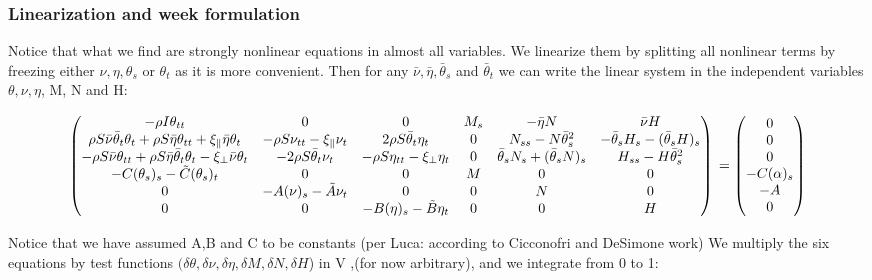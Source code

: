 
\usepackage{pdfsync}
\usepackage{amsmath}
\usepackage{graphicx}

\subsubsection{Linearization and week formulation}

Notice that what we find are strongly nonlinear equations in almost all variables.
We linearize them by splitting all nonlinear terms by freezing either $\nu, \eta, \theta_s$ or $\theta_t$ as it is more convenient. Then for any $\bar{\nu}, \bar{\eta}, \bar{\theta}_s$ and $\bar{\theta}_t$ we can write the linear system in the independent variables $\theta, \nu, \eta$, M, N and H:

\[\begin{pmatrix}
-\rho I \theta_{tt} & 0 & 0 & M_s & -\bar{\eta}N & \bar{\nu}H %
\\
\rho S\bar{\nu}\bar{\theta}_t\theta_t + \rho S \bar{\eta}\theta_{tt} + \xi_{\parallel}\bar{\eta}\theta_t & -\rho S \nu_{tt} -\xi_{\parallel}\nu_t & 2 \rho S\bar{\theta}_t\eta_t & 0 & N_{ss} - N\bar{\theta}_s^2 & -\bar{\theta}_s H_s - (\bar{\theta}_s H)_s 
\\
-\rho S \bar{\nu}\theta_{tt} + \rho S \bar{\eta}\bar{\theta}_t\theta_t - \xi_{\perp}\bar{\nu}\theta_t & - 2\rho S \bar{\theta}_t \nu_t & - \rho S \eta_{tt} - \xi_{\perp}\eta_t & 0 & \bar{\theta}_s N_s + (\bar{\theta}_s N)_s & H_{ss}-H\bar{\theta}_s^2 
\\
-C(\theta_s)_s -\tilde{C}(\theta_s)_t& 0 & 0 & M & 0 & 0 
\\
0 & -A(\nu)_s -\tilde{A}\nu_t & 0 & 0 & N & 0 
\\
0 & 0 & - B(\eta)_s - \tilde{B}\eta_t & 0 & 0 & H 
\end{pmatrix}
\\ =
\begin{pmatrix}
0\\
0\\
0\\
-C(\alpha)_s\\
-A\\
0
\end{pmatrix}\]

Notice that we have assumed A,B and C to be constants (per Luca: according to Cicconofri and DeSimone work)
We multiply the six equations by test functions
$(\delta \theta, \delta\nu, \delta \eta, \delta M,\delta N, \delta H$) in V ,(for now arbitrary), and we integrate from 0 to 1: 

